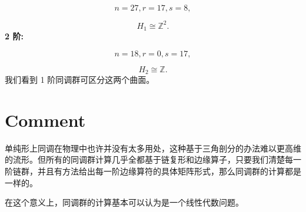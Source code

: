 \documentclass[UTF8]{ctexart}
\begin{document}
\begin{equation}
n=27,r=17,s=8,
\end{equation}

\begin{equation}
H_{1}\cong\mathbb{Z}^{2}.
\end{equation}
\textbf{2 阶:}

\begin{equation}
n=18,r=0,s=17,
\end{equation}

\begin{equation}
H_{2}\cong\mathbb{Z}.
\end{equation}
我们看到 1 阶同调群可区分这两个曲面。

\section*{Comment}
\noindent
单纯形上同调在物理中也许并没有太多用处，这种基于三角剖分的办法难以更高维的流形。但所有的同调群计算几乎全都基于链复形和边缘算子，只要我们清楚每一阶链群，并且有方法给出每一阶边缘算符的具体矩阵形式，那么同调群的计算都是一样的。

在这个意义上，同调群的计算基本可以认为是一个线性代数问题。
\end{document}
